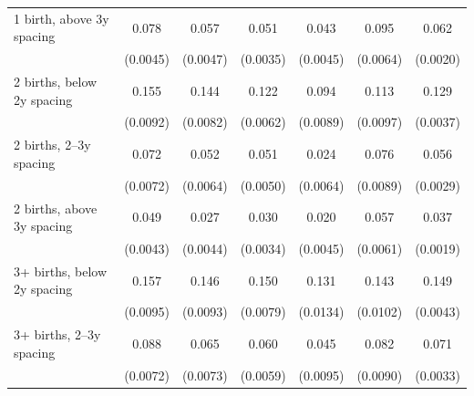 {\begin{tabular}{l*{6}{c}}
\addlinespace
\hspace*{1em}1 birth, above 3y spacing&       0.078\sym{***}&       0.057\sym{***}&       0.051\sym{***}&       0.043\sym{***}&       0.095\sym{***}&       0.062\sym{***}\\
                    &    (0.0045)         &    (0.0047)         &    (0.0035)         &    (0.0045)         &    (0.0064)         &    (0.0020)         \\
\addlinespace
\hspace*{1em}2 births, below 2y spacing&       0.155\sym{***}&       0.144\sym{***}&       0.122\sym{***}&       0.094\sym{***}&       0.113\sym{***}&       0.129\sym{***}\\
                    &    (0.0092)         &    (0.0082)         &    (0.0062)         &    (0.0089)         &    (0.0097)         &    (0.0037)         \\
\addlinespace
\hspace*{1em}2 births, 2–3y spacing&       0.072\sym{***}&       0.052\sym{***}&       0.051\sym{***}&       0.024\sym{***}&       0.076\sym{***}&       0.056\sym{***}\\
                    &    (0.0072)         &    (0.0064)         &    (0.0050)         &    (0.0064)         &    (0.0089)         &    (0.0029)         \\
\addlinespace
\hspace*{1em}2 births, above 3y spacing&       0.049\sym{***}&       0.027\sym{***}&       0.030\sym{***}&       0.020\sym{***}&       0.057\sym{***}&       0.037\sym{***}\\
                    &    (0.0043)         &    (0.0044)         &    (0.0034)         &    (0.0045)         &    (0.0061)         &    (0.0019)         \\
\addlinespace
\hspace*{1em}3+ births, below 2y spacing&       0.157\sym{***}&       0.146\sym{***}&       0.150\sym{***}&       0.131\sym{***}&       0.143\sym{***}&       0.149\sym{***}\\
                    &    (0.0095)         &    (0.0093)         &    (0.0079)         &    (0.0134)         &    (0.0102)         &    (0.0043)         \\
\addlinespace
\hspace*{1em}3+ births, 2–3y spacing&       0.088\sym{***}&       0.065\sym{***}&       0.060\sym{***}&       0.045\sym{***}&       0.082\sym{***}&       0.071\sym{***}\\
                    &    (0.0072)         &    (0.0073)         &    (0.0059)         &    (0.0095)         &    (0.0090)         &    (0.0033)         \\

\end{tabular}}
